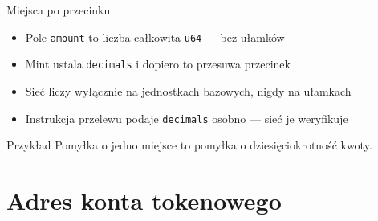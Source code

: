 \begin{frame}{Miejsca po przecinku}
  \begin{itemize}
    \item Pole \texttt{amount} to liczba całkowita \texttt{u64} --- bez ułamków
    \item Mint ustala \texttt{decimals} i dopiero to przesuwa przecinek
    \item Sieć liczy wyłącznie na jednostkach bazowych, nigdy na ułamkach
    \item Instrukcja przelewu podaje \texttt{decimals} osobno --- sieć je weryfikuje
  \end{itemize}
  \vspace{0.1cm}
  \begin{center}
  \end{center}
  \vspace{0.1cm}
  \begin{exampleblock}{Przykład}
    Pomyłka o jedno miejsce to pomyłka o dziesięciokrotność kwoty.
  \end{exampleblock}
\end{frame}

\section{Adres konta tokenowego}

